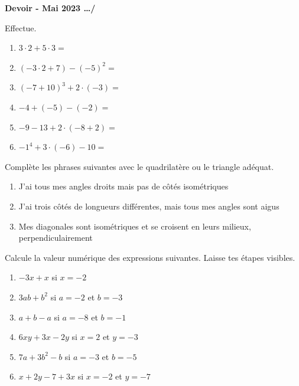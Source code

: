 \documentclass[12pt,parskip=half-, twoside=semi]{scrartcl}
\newcommand{\montitre}{Devoir - Mai 2023}
\begin{document}
\begin{huge}
    \bfseries
    \montitre
    \hfill
    \dots/
    \bigbreak
\end{huge}
	
\begin{exercise}[points=6]
	Effectue. 
	\begin{enumerate}[cols=2, itemsep=4cm]
		\item \(3\cdot 2 + 5 \cdot 3 =\)
		\item \((-3 \cdot 2 + 7) - (-5)^2=\)
		\item \((-7+10)^3 + 2 \cdot (-3)=\)
		\item \(-4 + (-5) - (-2)=\)
		\item \(-9 - 13 + 2 \cdot (-8 + 2)=\)
		\item \(-1^4 + 3 \cdot (-6) - 10=\)
	\end{enumerate}	
    \vspace{4cm}
\end{exercise}

\newpage
\begin{exercise}[points=3]
	Complète les phrases suivantes avec le quadrilatère ou le triangle adéquat. 
	\begin{enumerate}[itemsep=1.5cm]
		\item J'ai tous mes angles droits mais pas de côtés isométriques  
		\item J'ai trois côtés de longueurs différentes, mais tous mes angles sont aigus 
		\item Mes diagonales sont isométriques et se croisent en leurs milieux, perpendiculairement  
	\end{enumerate}
    \vspace{1.5cm}
\end{exercise}

\begin{exercise}[points=6]
    Calcule la valeur numérique des expressions suivantes. Laisse tes étapes visibles.
    \begin{enumerate}[cols=2, itemsep=4cm]
        \item \(-3x +x\) si \(x=-2\)
        \item \(3ab + b^2\) si \(a=-2\) et \(b=-3\)
        \item \(a + b - a\) si \(a=-8\) et \(b=-1\)
        \item \(6xy + 3x - 2y\) si \(x=2\) et \(y=-3\)
        \item \(7a + 3b^2 - b\) si \(a=-3\) et \(b=-5\)
        \item \(x + 2y - 7 + 3x\) si \(x=-2\) et \(y=-7\)
    \end{enumerate}
    \vspace{4cm}
\end{exercise}
\end{document}
